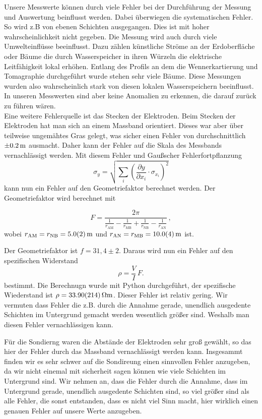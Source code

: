 Unsere Messwerte können durch viele Fehler bei der Durchführung der Messung und Auswertung beinflusst werden. Dabei überwiegen die systematischen Fehler. So wird z.B von ebenen Schichten ausgegangen. Dies ist mit hoher wahrscheinlichkeit nicht gegeben. 
Die Messung wird auch durch viele Umwelteinflüsse beeinflusst. Dazu zählen künstliche Ströme an der Erdoberfläche oder Bäume die durch Wasserspeicher in ihren Würzeln die elektrische Leitfähigkeit lokal erhöhen. Entlang des Profils an dem die Wennerkartierung und Tomagraphie durchgeführt wurde stehen sehr viele Bäume. Diese Messungen wurden also wahrscheinlich stark von diesen lokalen Wasserspeichern beeinflusst. In unseren Messwerten sind aber keine Anomalien zu erkennen, die darauf zurück zu führen wären.\\
Eine weitere Fehlerquelle ist das Stecken der Elektroden. Beim Stecken der Elektroden hat man sich an einem Massband orientiert. Dieses war aber über teilweise ungemähtes Gras gelegt, was sicher einen Fehler von durchschnittlich  $\SI{\pm 0,2}{m}$ ausmacht. Daher kann der Fehler auf die Skala des Messbands vernachlässigt werden.  
Mit diesem Fehler und Gaußscher Fehlerfortpflanzung 
\begin{equation}
\sigma_y = \sqrt{\sum_i \left( \frac{\partial y}{\partial x_i}\cdot \sigma_{x_i}\right)^2}
\end{equation}
kann nun ein Fehler auf den Geometriefaktor berechnet werden. Der Geometriefaktor wird berechnet mit 

$$F = \frac{2 \pi}{\frac{1}{r_{\mathrm{AM}}} - \frac{1}{r_{\mathrm{MB}}} + \frac{1}{r_{\mathrm{NB}}} - \frac{1}{r_{\mathrm{AN}}}}\,,$$
wobei $ r_\mathrm{AM} = r_\mathrm{NB} = \SI{5 \pm 0.2}{m}$  und $ r_{\mathrm{AN}} =  r_{\mathrm{MB}} = \SI{10 \pm 0.4}{m}$ ist.

Der Geometriefaktor ist $f= 31,4 \pm 2 $. Daraus wird nun ein Fehler auf den spezifischen Widerstand  
\begin{equation}
\rho = \frac{V}{I} \, F.
\end{equation} \label{eq:roh}
bestimmt.
Die Berechnugn wurde mit Python durchgeführt, der spezifische Wiederstand ist $\rho= \SI{33,9 \pm 2,14}{\Omega m}$.
Dieser Fehler ist relativ gering. Wir vermuten dass Fehler die z.B. durch die Annahme gerade, unendlich ausgedente Schichten im Untergrund gemacht werden wesentlich größer sind. Weshalb man diesen Fehler vernachlässigen kann.



Für die Sondierng waren die Abstände der Elektroden sehr groß gewählt, so das hier der Fehler durch das Massband vernachlässigt werden kann. Insgesammt finden wir es sehr schwer auf die Sondireung einen sinnvollen Fehler anzugeben, da wir nicht einemal mit sicherheit sagen können wie viele Schichten im Untergrund sind. Wir nehmen an, dass die Fehler durch die Annahme, dass im Untergrund gerade, unendlich ausgedente Schichten sind, so viel größer sind als alle Fehler, die sonst entstanden, dass es nicht viel Sinn macht, hier wirklich einen genauen Fehler auf unsere Werte anzugeben.

